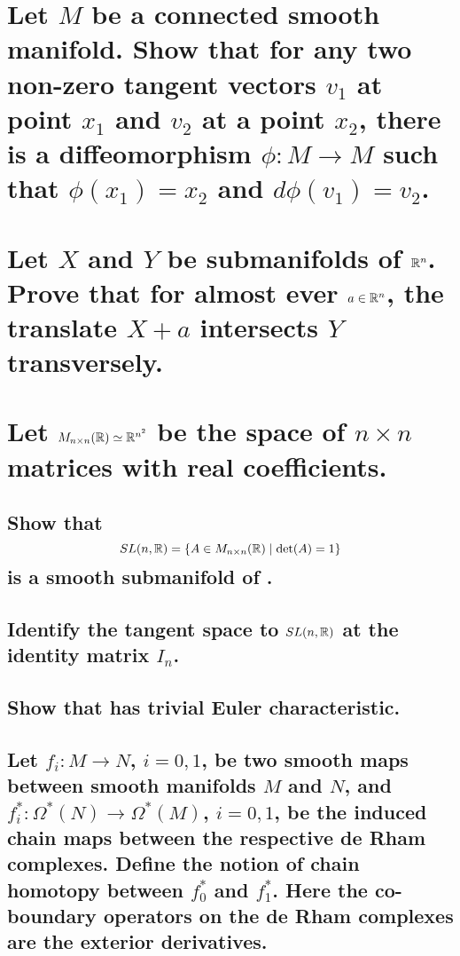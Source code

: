\documentclass[10pt]{article}
\begin{document}
 

\section{Let $M$ be a connected smooth manifold. Show that for any two non-zero tangent vectors
  $v_1$ at point $x_1$ and $v_2$ at a point $x_2$, there is a diffeomorphism $\phi : M \to M$ such
  that $\phi(x_1) = x_2$ and $d\phi(v_1) = v_2$.}

\section{Let $X$ and $Y$ be submanifolds of $\mathbb{R}^n$. Prove that for almost ever $a \in \mathbb{R}^n$, the
  translate $X + a$ intersects $Y$ transversely.}

\section{Let $M_{n \times n}(\mathbb{R}) \simeq \mathbb{R}^{n^2}$ be the space of $n \times n$ matrices with real
  coefficients.}
\subsection{Show that $$ SL(n,\mathbb{R}) = \{ A \in M_{n \times n}(\mathbb{R}) \mid \det(A) = 1 \}$$ is a smooth
  submanifold of .}
\subsection{Identify the tangent space to $SL(n,\mathbb{R})$ at the identity matrix $I_n$.}
\subsection{Show that  has trivial Euler characteristic.}

\advsection
\subsection{Let $f_i : M \to N$, $i = 0,1$, be two smooth maps between smooth manifolds $M$ and $N$,
  and $f_i^* : \Omega^*(N) \to \Omega^*(M)$, $i = 0,1$, be the induced chain maps between the
  respective de Rham complexes. Define the notion of chain homotopy between $f_0^*$ and
  $f_1^*$. Here the co-boundary operators on the de Rham complexes are the exterior derivatives.}
\end{document}
